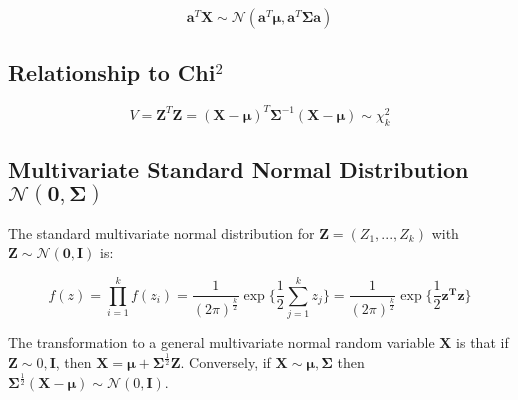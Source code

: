 \begin{equation}
\mathbf{a}^T \mathbf{X} \sim \mathscr{N}(\mathbf{a}^T \mathbf{\mu}, \mathbf{a}^T\mathbf{\Sigma}\mathbf{a})
\end{equation}

\subsection{Relationship to Chi$^2$}
\begin{equation}
V = \mathbf{Z}^T\mathbf{Z} = (\mathbf{X}-\mathbf{\mu})^T\mathbf{\Sigma}^{-1}(\mathbf{X}-\mathbf{\mu}) \sim \chi^2_k
\end{equation}

\subsection{Multivariate Standard Normal Distribution $\mathscr{N}(\mathbf{0},\mathbf{\Sigma})$}
The standard multivariate normal distribution for $\mathbf{Z} = (Z_1,...,Z_k)$ with $\mathbf{Z} \sim \mathscr{N}(\mathbf{0},\mathbf{I})$ is:

\begin{equation}
f(z) = \prod^k_{i=1} f(z_i) = \frac{1}{(2\pi)^{\frac{k}{2}}}\exp \{ \frac{1}{2} \sum^{k}_{j=1} z_j\} = \frac{1}{(2\pi)^{\frac{k}{2}}}\exp \{ \frac{1}{2} \mathbf{z^T z}\}
\end{equation}

The transformation to a general multivariate normal random variable $\mathbf{X}$ is that if $\mathbf{Z} \sim \mathscr{0,\mathbf{I}}$, then $\mathbf{X} = \mathbf{\mu} + \mathbf{\Sigma}^{\frac{1}{2}}\mathbf{Z}$. Conversely, if $\mathbf{X}\sim \mathscr{\mathbf{\mu},\mathbf{\Sigma}}$ then $\mathbf{\Sigma}^{\frac{1}{2}}(\mathbf{X}-\mathbf{\mu}) \sim \mathscr{N}(0,\mathbf{I})$.
